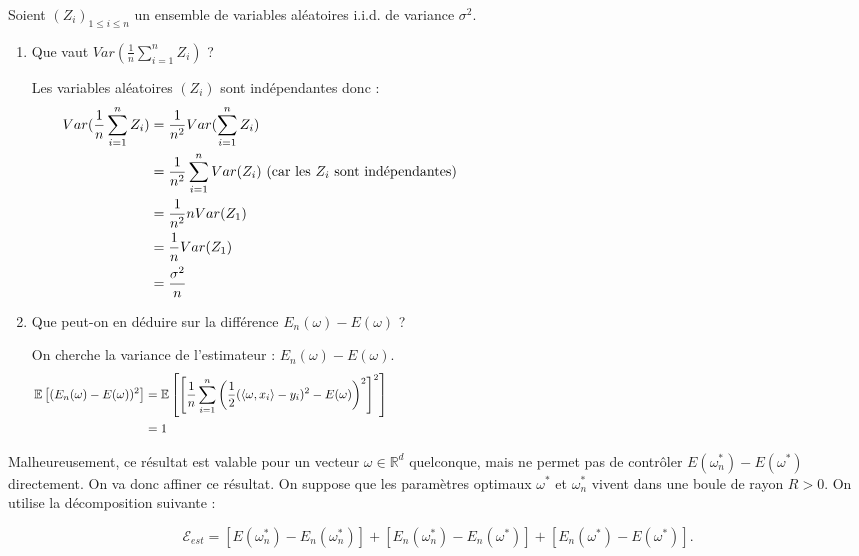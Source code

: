 \documentclass[12pt,a4paper]{article}
\begin{document}
Soient $(Z_i)_{1\leq i \leq n}$ un ensemble de variables aléatoires i.i.d. de variance $\sigma^2$.
\begin{enumerate}
    \color{black}
    \item Que vaut $Var(\frac{1}{n} \sum_{i = 1}^n Z_i)$ ?
    
    \color{blue}
    Les variables aléatoires $(Z_i)$ sont indépendantes donc :
    \begin{align*}
        Var(\frac{1}{n} \sum_{i = 1}^n Z_i) &= \frac{1}{n^2} Var(\sum_{i = 1}^n Z_i) \hspace{14.5cm}\\
        &= \frac{1}{n^2} \sum_{i = 1}^n Var(Z_i) \text{ (car les } Z_i \text{ sont indépendantes)}\\
        &= \frac{1}{n^2} n Var(Z_1) \\
        &= \frac{1}{n} Var(Z_1) \\
        &= \frac{\sigma^2}{n}
    \end{align*}

    \color{black}
    \item Que peut-on en déduire sur la différence $E_n(\omega) - E(\omega)$ ?
    
    \color{blue}
    On cherche la variance de l'estimateur : $E_n(\omega) - E(\omega)$.
    \begin{align*}
        \mathbb{E}\left[(E_n(\omega) - E(\omega))^2\right] &= \mathbb{E}\left[\left[\frac{1}{n}\sum_{i = 1}^n \left( \frac{1}{2}(\langle \omega, x_i \rangle - y_i)^2 - E(\omega)\right)^2\right]^2 \right] \hspace{14.5cm}\\
        &= 1
    \end{align*}

    \color{black}
\end{enumerate}


Malheureusement, ce résultat est valable pour un vecteur
$\omega \in \mathbb{R}^d$ quelconque, mais ne permet pas de contrôler $E(\omega_n^*) - E(\omega^*)$ directement.
On va donc affiner ce résultat.
On suppose que les paramètres optimaux $\omega^*$ et $\omega_n^*$ vivent dans une boule de rayon $R > 0$.
On utilise la décomposition suivante :

$$
\mathcal{E}_{est} = [ E(\omega_n^*) - E_n(\omega_n^*)] + [ E_n(\omega_n^*) - E_n(\omega^*)] + [ E_n(\omega^*) - E(\omega^*)].
$$
\end{document}
